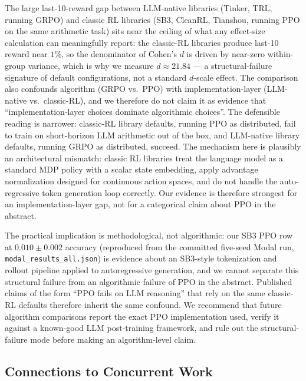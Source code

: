 \documentclass{article}
\begin{document}
The large last-10-reward gap between LLM-native libraries (Tinker, TRL,
running GRPO) and classic RL libraries (SB3, CleanRL, Tianshou,
running PPO on the same arithmetic task) sits near the ceiling of
what any effect-size calculation can meaningfully report: the
classic-RL libraries produce last-10 reward near $1\%$, so the
denominator of Cohen's $d$ is driven by near-zero within-group
variance, which is why we measure $d \approx 21.84$ --- a
structural-failure signature of default configurations, not a
standard $d$-scale effect. The comparison also confounds
algorithm (GRPO vs.\ PPO) with implementation-layer (LLM-native vs.\
classic-RL), and we therefore do not claim it as evidence that
``implementation-layer choices dominate algorithmic choices''.
The defensible reading is narrower: classic-RL library defaults,
running PPO as distributed, fail to train on short-horizon LLM
arithmetic out of the box, and LLM-native library defaults,
running GRPO as distributed, succeed.
The mechanism here is plausibly an architectural mismatch: classic RL
libraries treat the language model as a standard MDP policy with a scalar
state embedding, apply advantage normalization designed for continuous action
spaces, and do not handle the auto-regressive token generation loop
correctly. Our evidence is therefore strongest for an implementation-layer gap,
not for a categorical claim about PPO in the abstract.

The practical implication is methodological, not algorithmic: our
SB3 PPO row at $0.010 \pm 0.002$ accuracy (reproduced from the committed
five-seed Modal run, \texttt{modal\_results\_all.json}) is evidence about an
SB3-style tokenization and rollout pipeline applied to
autoregressive generation, and we cannot separate this structural
failure from an algorithmic failure of PPO in the abstract.
Published claims of the form ``PPO fails on LLM reasoning'' that
rely on the same classic-RL defaults therefore inherit the same
confound. We recommend that future algorithm comparisons report the
exact PPO implementation used, verify it against a known-good
LLM post-training framework, and rule out the structural-failure
mode before making an algorithm-level claim.

\subsection{Connections to Concurrent Work}
\label{sec:discuss_related}
\end{document}
